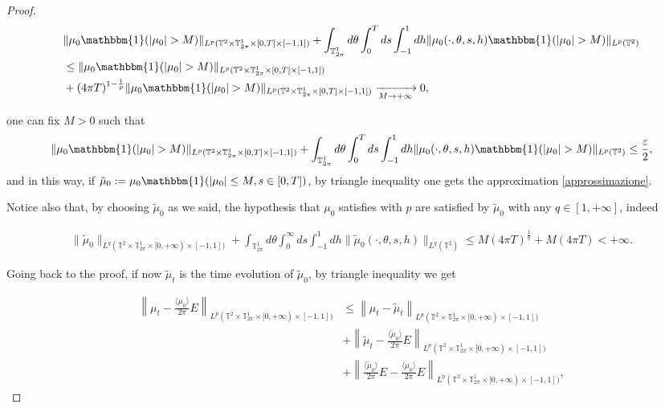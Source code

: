 \documentclass[a4paper,10pt,reqno]{amsart}
\numberwithin{equation}{subsection}
\numberwithin{figure}{subsection}
\begin{document}
\begin{proof}
{\scriptsize\begin{align*}
&\|\mu_0\mathbbm{1}(|\mu_0|> M)\|_{L^p(\mathbb{T}^2\times\mathbb{T}^1_{2\pi}\times[0,T]\times[-1,1])}+\int_{\mathbb{T}^1_{2\pi}}d\theta\int_0^Tds\int_{-1}^1dh\|\mu_0(\cdot,\theta,s,h)\mathbbm{1}(|\mu_0|> M)\|_{L^p(\mathbb{T}^2)}
\\
&\leq\|\mu_0\mathbbm{1}(|\mu_0|> M)\|_{L^p(\mathbb{T}^2\times\mathbb{T}^1_{2\pi}\times[0,T]\times[-1,1])}
\\
&+(4\pi T)^{1-\frac{1}{p}}\|\mu_0\mathbbm{1}(|\mu_0|> M)\|_{L^p(\mathbb{T}^2\times\mathbb{T}^1_{2\pi}\times[0,T]\times[-1,1])}\xrightarrow[M\to+\infty]{}0,
\end{align*}}

one can fix $M>0$ such that
{\scriptsize\[
\|\mu_0\mathbbm{1}(|\mu_0|> M)\|_{L^p(\mathbb{T}^2\times\mathbb{T}^1_{2\pi}\times[0,T]\times[-1,1])}+\int_{\mathbb{T}^1_{2\pi}}d\theta\int_0^Tds\int_{-1}^1dh\|\mu_0(\cdot,\theta,s,h)\mathbbm{1}(|\mu_0|> M)\|_{L^p(\mathbb{T}^2)}\leq\frac{\varepsilon}{2},
\]}
and in this way, if $\tilde\mu_0:=\mu_0\mathbbm{1}(|\mu_0|\leq M,s\in[0,T])$, by triangle inequality one gets the approximation \eqref{approssimazione}.

Notice also that, by choosing $\tilde\mu_0$ as we said, the hypothesis that $\mu_0$ satisfies with $p$ are satisfied by $\tilde\mu_0$ with any $q\in[1,+\infty]$, indeed

{\tiny\begin{align}\label{ogniq}
\|\tilde\mu_0\|_{L^q(\mathbb{T}^2\times\mathbb{T}^1_{2\pi}\times[0,+\infty)\times[-1,1])}+\int_{\mathbb{T}^1_{2\pi}}d\theta\int_0^{\infty}ds\int_{-1}^1dh\|\tilde\mu_0(\cdot,\theta,s,h)\|_{L^q(\mathbb{T}^2)}\leq M(4\pi T)^{\frac{1}{q}}+M(4\pi T)<+\infty.
\end{align}}

Going back to the proof, if now $\tilde\mu_t$ is the time evolution of $\tilde\mu_0$, by triangle inequality we get

{\small\begin{align}
\label{primopezzo}\left\|\mu_t-\frac{\langle\mu_0\rangle}{2\pi}E\right\|_{L^p(\mathbb{T}^2\times\mathbb{T}^1_{2\pi}\times[0,+\infty)\times[-1,1])}&\leq\left\|\mu_t-\tilde\mu_t\right\|_{L^p(\mathbb{T}^2\times\mathbb{T}^1_{2\pi}\times[0,+\infty)\times[-1,1])}
\\
\label{secondopezzo}&+\left\|\tilde\mu_t-\frac{\langle\tilde\mu_0\rangle}{2\pi}E\right\|_{L^p(\mathbb{T}^2\times\mathbb{T}^1_{2\pi}\times[0,+\infty)\times[-1,1])}
\\
\label{terzopezzo}&+\left\|\frac{\langle\tilde\mu_0\rangle}{2\pi}E-\frac{\langle\mu_0\rangle}{2\pi}E\right\|_{L^p(\mathbb{T}^2\times\mathbb{T}^1_{2\pi}\times[0,+\infty)\times[-1,1])},
\end{align}}


\end{proof}
\end{document}
